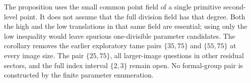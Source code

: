 \begin{remark}
\label{rem:B-RD84-scope}
The proposition uses the small common point field of a
single primitive second-level point. It does not assume
that the full division field has that degree. Both the
high and the low translations in that same field are
essential; using only the low inequality would leave
spurious one-divisible parameter candidates.
The corollary removes the earlier exploratory tame pairs
\(\{35,75\}\) and \(\{55,75\}\) at every image size.
The pair \(\{25,75\}\), all larger-image questions in
other residual sectors, and the full index interval
\(\{2,3\}\) remain open. No formal-group pair is
constructed by the finite parameter enumeration.
\end{remark}
